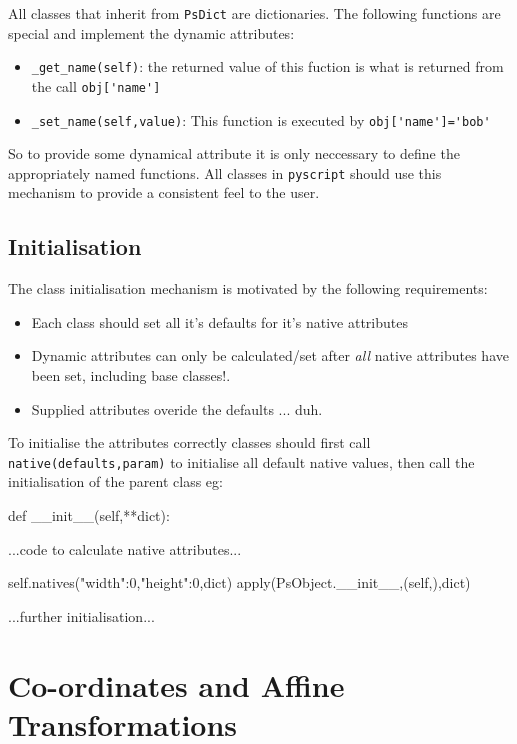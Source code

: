 \documentclass[a4paper]{book}
\begin{document}
All classes that inherit from \Verb|PsDict| are dictionaries. 
The following functions are special and implement the dynamic attributes:
\begin{itemize}
\item \Verb|_get_name(self)|: the returned value of this fuction is what is
  returned from the call \Verb|obj['name']|
\item \Verb|_set_name(self,value)|: This function is executed by
  \Verb|obj['name']='bob'|

\end{itemize}
So to provide some dynamical attribute it is only neccessary to define 
the appropriately named functions. All classes in \Verb|pyscript|
should use this mechanism to provide a consistent feel to the user.

\subsection{Initialisation}
\label{sec:initialisation}

The class initialisation mechanism is motivated by the following
requirements:

\begin{itemize}
\item Each class should set all it's defaults for it's native attributes
\item Dynamic attributes can only be calculated/set after \emph{all} native
  attributes have been set, including base classes!.
\item Supplied attributes overide the defaults ... duh.
\end{itemize}

To initialise the attributes correctly classes should first call
\Verb|native(defaults,param)| to initialise all default native values, then
call the initialisation of the parent class eg:
\begin{python}
def __init__(self,**dict):
   
   ...code to calculate native attributes...

   self.natives({"width":0,"height":0},dict)
   apply(PsObject.__init__,(self,),dict)

   ...further initialisation...
\end{python}



\section{Co-ordinates and Affine Transformations}
\label{sec:co-ordinates-affine}
\end{document}
